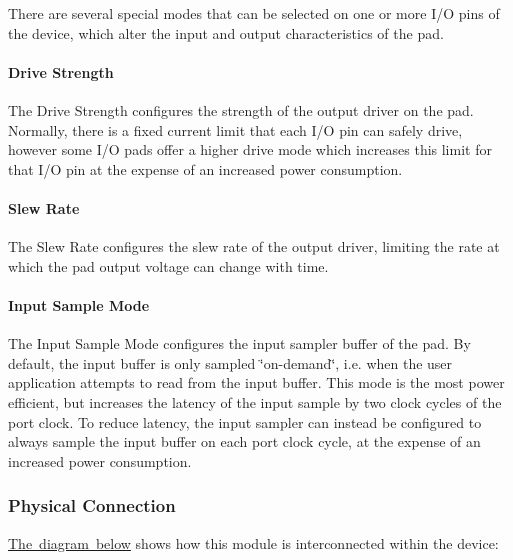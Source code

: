 There are several special modes that can be selected on one or more I/O pins of the device, which alter the input and output characteristics of the pad.\hypertarget{group__asfdoc__sam0__system__pinmux__group_asfdoc_sam0_system_pinmux_drive_strength}{}\paragraph{Drive Strength}\label{group__asfdoc__sam0__system__pinmux__group_asfdoc_sam0_system_pinmux_drive_strength}
The Drive Strength configures the strength of the output driver on the pad. Normally, there is a fixed current limit that each I/O pin can safely drive, however some I/O pads offer a higher drive mode which increases this limit for that I/O pin at the expense of an increased power consumption.\hypertarget{group__asfdoc__sam0__system__pinmux__group_asfdoc_sam0_system_pinmux_slew_rate}{}\paragraph{Slew Rate}\label{group__asfdoc__sam0__system__pinmux__group_asfdoc_sam0_system_pinmux_slew_rate}
The Slew Rate configures the slew rate of the output driver, limiting the rate at which the pad output voltage can change with time.\hypertarget{group__asfdoc__sam0__system__pinmux__group_asfdoc_sam0_system_pinmux_input_sample_mode}{}\paragraph{Input Sample Mode}\label{group__asfdoc__sam0__system__pinmux__group_asfdoc_sam0_system_pinmux_input_sample_mode}
The Input Sample Mode configures the input sampler buffer of the pad. By default, the input buffer is only sampled \char`\"{}on-\/demand\char`\"{}, i.\+e. when the user application attempts to read from the input buffer. This mode is the most power efficient, but increases the latency of the input sample by two clock cycles of the port clock. To reduce latency, the input sampler can instead be configured to always sample the input buffer on each port clock cycle, at the expense of an increased power consumption.\hypertarget{group__asfdoc__sam0__system__pinmux__group_asfdoc_sam0_system_pinmux_module_overview_physical}{}\subsubsection{Physical Connection}\label{group__asfdoc__sam0__system__pinmux__group_asfdoc_sam0_system_pinmux_module_overview_physical}
\mbox{\hyperlink{group__asfdoc__sam0__system__pinmux__group_asfdoc_sam0_system_pinmux_intconnections}{The diagram below}} shows how this module is interconnected within the device\+:

